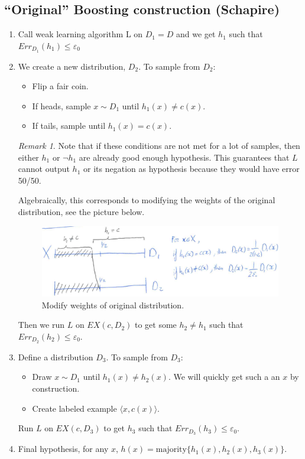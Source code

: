 \documentclass[12pt, letterpaper]{article}
\numberwithin{equation}{section} %
\newcommand{\ve}{\varepsilon}
\theoremstyle{definition}
\theoremstyle{remark}
\newtheorem{remark}[theorem]{Remark}
\begin{document}
\subsection{``Original'' Boosting construction (Schapire)}
\begin{enumerate}
\item Call weak learning algorithm L on $D_1 = D$ and we get $h_1$ such that $Err_{D_1}(h_1)\leq \ve_0$
\item We create a new distribution, $D_2$. To sample from $D_2$:
\begin{itemize}
\item Flip a fair coin.
\item If heads, sample $x\sim D_1$ until $h_1(x)\ne c(x)$.
\item If tails, sample until $h_1(x) = c(x)$.
\end{itemize}
\begin{remark}
Note that if these conditions are not met for a lot of samples, then either $h_1$ or $\lnot h_1$ are already good enough hypothesis. This guarantees that $L$ cannot output $h_1$ or its negation as hypothesis because they would have error 50/50.
\end{remark}
Algebraically, this corresponds to modifying the weights of the original distribution, see the picture below.
\begin{figure}[H]
\centering
\includegraphics[width=0.6\linewidth]{../img/weights.png}
\caption{Modify weights of original distribution.}
\end{figure}
Then we run $L$ on $EX(c,D_2)$ to get some $h_2\ne h_1$ such that $Err_{D_2}(h_2)\leq \ve_0$.
\item Define a distribution $D_3$. To sample from $D_3$:
\begin{itemize}
\item Draw $x\sim D_1$ until $h_1(x) \ne h_2(x)$. We will quickly get such a an $x$ by construction.
\item Create labeled example $\langle x, c(x) \rangle$.
\end{itemize}
Run $L$ on $EX(c, D_3)$ to get $h_3$ such that $Err_{D_3}(h_3)\leq \ve_0$.
\item Final hypothesis, for any $x$, $h(x) = \mathrm{majority}\lbrace h_1(x), h_2(x), h_3(x)\rbrace$.
\end{enumerate}
\end{document}
